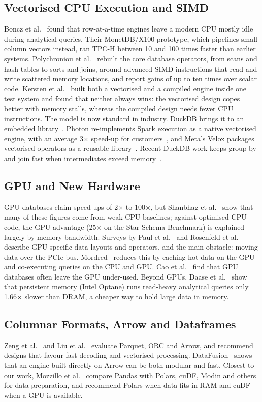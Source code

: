 \documentclass[conference,a4paper]{IEEEtran}
\begin{document}
\subsection{Vectorised CPU Execution and SIMD}
Boncz et al.~\cite{boncz05} found that row-at-a-time engines leave a modern CPU mostly idle during analytical queries. Their MonetDB/X100 prototype, which pipelines small column vectors instead, ran TPC-H between 10 and 100 times faster than earlier systems. Polychroniou et al.~\cite{polychroniou15} rebuilt the core database operators, from scans and hash tables to sorts and joins, around advanced SIMD instructions that read and write scattered memory locations, and report gains of up to ten times over scalar code. Kersten et al.~\cite{kersten18} built both a vectorised and a compiled engine inside one test system and found that neither always wins: the vectorised design copes better with memory stalls, whereas the compiled design needs fewer CPU instructions. The model is now standard in industry. DuckDB brings it to an embedded library~\cite{raasveldt19}. Photon re-implements Spark execution as a native vectorised engine, with an average 3$\times$ speed-up for customers~\cite{behm22}, and Meta's Velox packages vectorised operators as a reusable library~\cite{pedreira22}. Recent DuckDB work keeps group-by and join fast when intermediates exceed memory~\cite{kuiper24,kuiper25}.

\subsection{GPU and New Hardware}
GPU databases claim speed-ups of 2$\times$ to 100$\times$, but Shanbhag et al.~\cite{shanbhag20} show that many of these figures come from weak CPU baselines; against optimised CPU code, the GPU advantage (25$\times$ on the Star Schema Benchmark) is explained largely by memory bandwidth. Surveys by Paul et al.~\cite{paul21} and Rosenfeld et al.~\cite{rosenfeld23} describe GPU-specific data layouts and operators, and the main obstacle: moving data over the PCIe bus. Mordred~\cite{yogatama22} reduces this by caching hot data on the GPU and co-executing queries on the CPU and GPU. Cao et al.~\cite{cao23} find that GPU databases often leave the GPU under-used. Beyond GPUs, Daase et al.~\cite{daase21} show that persistent memory (Intel Optane) runs read-heavy analytical queries only 1.66$\times$ slower than DRAM, a cheaper way to hold large data in memory.

\subsection{Columnar Formats, Arrow and Dataframes}
Zeng et al.~\cite{zeng23} and Liu et al.~\cite{liu23} evaluate Parquet, ORC and Arrow, and recommend designs that favour fast decoding and vectorised processing. DataFusion~\cite{lamb24} shows that an engine built directly on Arrow can be both modular and fast. Closest to our work, Mozzillo et al.~\cite{mozzillo25} compare Pandas with Polars, cuDF, Modin and others for data preparation, and recommend Polars when data fits in RAM and cuDF when a GPU is available.
\end{document}

